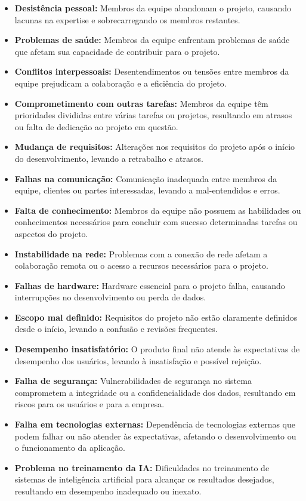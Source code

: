 \begin{itemize}
    \item \textbf{Desistência pessoal:} Membros da equipe abandonam o projeto, causando lacunas na expertise e sobrecarregando os membros restantes.
    \item \textbf{Problemas de saúde:} Membros da equipe enfrentam problemas de saúde que afetam sua capacidade de contribuir para o projeto.
    \item \textbf{Conflitos interpessoais:} Desentendimentos ou tensões entre membros da equipe prejudicam a colaboração e a eficiência do projeto.
    \item \textbf{Comprometimento com outras tarefas:} Membros da equipe têm prioridades divididas entre várias tarefas ou projetos, resultando em atrasos ou falta de dedicação ao projeto em questão.
    \item \textbf{Mudança de requisitos:} Alterações nos requisitos do projeto após o início do desenvolvimento, levando a retrabalho e atrasos.
    \item \textbf{Falhas na comunicação:} Comunicação inadequada entre membros da equipe, clientes ou partes interessadas, levando a mal-entendidos e erros.
    \item \textbf{Falta de conhecimento:} Membros da equipe não possuem as habilidades ou conhecimentos necessários para concluir com sucesso determinadas tarefas ou aspectos do projeto.
    \item \textbf{Instabilidade na rede:} Problemas com a conexão de rede afetam a colaboração remota ou o acesso a recursos necessários para o projeto.
    \item \textbf{Falhas de hardware:} Hardware essencial para o projeto falha, causando interrupções no desenvolvimento ou perda de dados.
    \item \textbf{Escopo mal definido:} Requisitos do projeto não estão claramente definidos desde o início, levando a confusão e revisões frequentes.
    \item \textbf{Desempenho insatisfatório:} O produto final não atende às expectativas de desempenho dos usuários, levando à insatisfação e possível rejeição.
    \item \textbf{Falha de segurança:} Vulnerabilidades de segurança no sistema comprometem a integridade ou a confidencialidade dos dados, resultando em riscos para os usuários e para a empresa.
    \item \textbf{Falha em tecnologias externas:} Dependência de tecnologias externas que podem falhar ou não atender às expectativas, afetando o desenvolvimento ou o funcionamento da aplicação.
    \item \textbf{Problema no treinamento da IA:} Dificuldades no treinamento de sistemas de inteligência artificial para alcançar os resultados desejados, resultando em desempenho inadequado ou inexato.
\end{itemize}